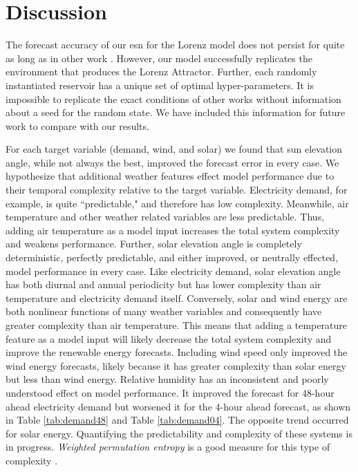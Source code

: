 \section{Discussion}

The forecast accuracy of our \gls{esn} for the Lorenz model does not persist
for quite as long as in other work \cite{pathak_using_2017}. However, our
model successfully replicates the environment that produces the Lorenz
Attractor. Further, each randomly instantiated reservoir has a unique set of
optimal hyper-parameters. It is impossible to replicate the exact conditions of
other works without information about a seed for the random state. We have
included this information for future work to compare with our results.

For each target variable (demand, wind, and solar) we found that sun
elevation angle, while not always the best, improved the forecast error in
every case. We hypothesize that additional weather features effect model
performance due to their temporal
complexity relative to the target variable. Electricity demand,
for example, is quite ``predictable," and therefore has low complexity.
Meanwhile, air
temperature and other weather related variables are less predictable. Thus,
adding air temperature as a model input increases the total system complexity
and weakens performance. Further, solar elevation angle is completely
deterministic, perfectly predictable, and either improved,
or neutrally effected, model performance in every case. Like electricity
demand, solar elevation angle has both diurnal and annual periodicity but has
lower complexity than air temperature and electricity demand itself.
Conversely, solar and wind energy are both nonlinear functions of many weather
variables and consequently have greater complexity than air temperature. This
means that adding a temperature feature as a model input will likely decrease
the total system complexity and improve the renewable energy forecasts. Including wind
speed only improved the wind energy forecasts, likely because it has greater
complexity than solar energy but less than wind energy. Relative humidity has
an inconsistent and poorly understood effect on model performance. It improved
the forecast for 48-hour ahead electricity demand but worsened it for the 4-hour
ahead forecast, as shown in Table \ref{tab:demand48} and Table
\ref{tab:demand04}. The opposite trend occurred for solar energy.
Quantifying the predictability and complexity of these systems is in progress.
\textit{Weighted permutation entropy} is a good measure for this type of
complexity \cite{fadlallah_weighted-permutation_2013,garland_model-free_2014, pennekamp_intrinsic_2019}.

